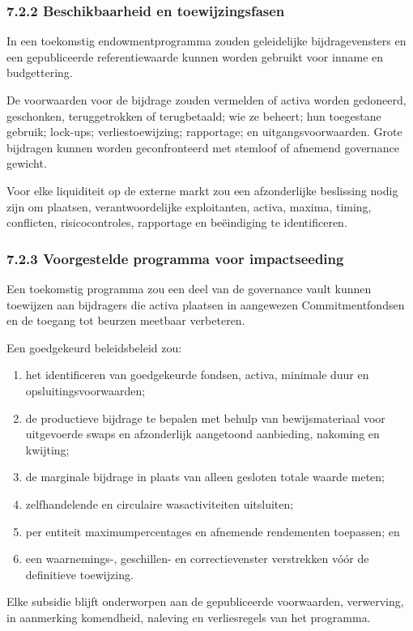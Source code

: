 \documentclass[11pt]{article}
\begin{document}
\subsubsection*{7.2.2 Beschikbaarheid en toewijzingsfasen}

In een toekomstig endowmentprogramma zouden geleidelijke bijdragevensters en een gepubliceerde referentiewaarde kunnen worden gebruikt voor inname en budgettering.

De voorwaarden voor de bijdrage zouden vermelden of activa worden gedoneerd, geschonken, teruggetrokken of terugbetaald; wie ze beheert; hun toegestane gebruik; lock-ups; verliestoewijzing; rapportage; en uitgangsvoorwaarden. Grote bijdragen kunnen worden geconfronteerd met stemloof of afnemend governance gewicht.

Voor elke liquiditeit op de externe markt zou een afzonderlijke beslissing nodig zijn om plaatsen, verantwoordelijke exploitanten, activa, maxima, timing, conflicten, risicocontroles, rapportage en beëindiging te identificeren.

\subsubsection*{7.2.3 Voorgestelde programma voor impactseeding}

Een toekomstig programma zou een deel van de governance vault kunnen toewijzen aan bijdragers die activa plaatsen in aangewezen Commitmentfondsen en de toegang tot beurzen meetbaar verbeteren.

Een goedgekeurd beleidsbeleid zou:

\begin{enumerate}[leftmargin=*]
\item het identificeren van goedgekeurde fondsen, activa, minimale duur en opsluitingsvoorwaarden;
\item de productieve bijdrage te bepalen met behulp van bewijsmateriaal voor uitgevoerde swaps en afzonderlijk aangetoond aanbieding, nakoming en kwijting;
\item de marginale bijdrage in plaats van alleen gesloten totale waarde meten;
\item zelfhandelende en circulaire wasactiviteiten uitsluiten;
\item per entiteit maximumpercentages en afnemende rendementen toepassen; en
\item een waarnemings-, geschillen- en correctievenster verstrekken vóór de definitieve toewijzing.
\end{enumerate}
Elke subsidie blijft onderworpen aan de gepubliceerde voorwaarden, verwerving, in aanmerking komendheid, naleving en verliesregels van het programma.
\end{document}

